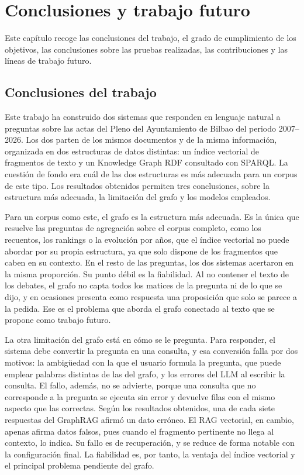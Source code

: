 \documentclass[11pt, a4paper]{report}
\begin{document}
	\chapter{Conclusiones y trabajo futuro}
	\label{ch:conclusiones}

	Este capítulo recoge las conclusiones del trabajo, el grado de cumplimiento de
	los objetivos, las conclusiones sobre las pruebas realizadas, las
	contribuciones y las líneas de trabajo futuro.

	\section{Conclusiones del trabajo}

	Este trabajo ha construido dos sistemas que responden en lenguaje natural a
	preguntas sobre las actas del Pleno del Ayuntamiento de Bilbao del periodo
	2007--2026. Los dos parten de los mismos documentos y de la misma información,
	organizada en dos estructuras de datos distintas: un índice vectorial de
	fragmentos de texto y un Knowledge Graph RDF consultado con SPARQL. La
	cuestión de fondo era cuál de las dos estructuras es más adecuada para un corpus de este tipo. Los resultados
	obtenidos permiten tres conclusiones, sobre la estructura más adecuada, la
	limitación del grafo y los modelos empleados.

	Para un corpus como este, el grafo es la estructura más adecuada. Es la única que resuelve las preguntas de agregación sobre el corpus
	completo, como los recuentos, los rankings o la evolución por años, que el
	índice vectorial no puede abordar por su propia estructura, ya que solo
	dispone de los fragmentos que caben en su contexto. En el resto de las
	preguntas, los dos sistemas acertaron en la misma proporción. Su punto débil
	es la fiabilidad. Al no contener el texto de los debates, el grafo no capta
	todos los matices de la pregunta ni de lo que se dijo, y en ocasiones presenta
	como respuesta una proposición que solo se parece a la pedida. Ese es el
	problema que aborda el grafo conectado al texto que se propone como trabajo
	futuro.

	La otra limitación del grafo está en cómo se le pregunta. Para responder, el sistema debe convertir la pregunta en
	una consulta, y esa conversión falla por dos motivos: la ambigüedad con la que
	el usuario formula la pregunta, que puede emplear palabras distintas de las
	del grafo, y los errores del LLM al escribir la consulta. El fallo, además, no
	se advierte, porque una consulta que no corresponde a la pregunta se ejecuta
	sin error y devuelve filas con el mismo aspecto que las correctas. Según los
	resultados obtenidos, una de cada siete respuestas del GraphRAG afirmó un dato
	erróneo. El RAG vectorial, en cambio, apenas afirma datos falsos, pues cuando el
	fragmento pertinente no llega al contexto, lo indica. Su fallo es de
	recuperación, y se reduce de forma notable con la configuración final.
	La fiabilidad es, por tanto, la ventaja del índice vectorial y el principal
	problema pendiente del grafo.
\end{document}
